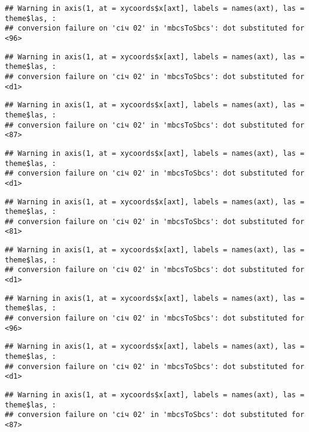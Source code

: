 \documentclass[]{article}
\begin{document}
\begin{verbatim}
## Warning in axis(1, at = xycoords$x[axt], labels = names(axt), las = theme$las, :
## conversion failure on 'січ 02' in 'mbcsToSbcs': dot substituted for <96>
\end{verbatim}

\begin{verbatim}
## Warning in axis(1, at = xycoords$x[axt], labels = names(axt), las = theme$las, :
## conversion failure on 'січ 02' in 'mbcsToSbcs': dot substituted for <d1>
\end{verbatim}

\begin{verbatim}
## Warning in axis(1, at = xycoords$x[axt], labels = names(axt), las = theme$las, :
## conversion failure on 'січ 02' in 'mbcsToSbcs': dot substituted for <87>
\end{verbatim}

\begin{verbatim}
## Warning in axis(1, at = xycoords$x[axt], labels = names(axt), las = theme$las, :
## conversion failure on 'січ 02' in 'mbcsToSbcs': dot substituted for <d1>
\end{verbatim}

\begin{verbatim}
## Warning in axis(1, at = xycoords$x[axt], labels = names(axt), las = theme$las, :
## conversion failure on 'січ 02' in 'mbcsToSbcs': dot substituted for <81>
\end{verbatim}

\begin{verbatim}
## Warning in axis(1, at = xycoords$x[axt], labels = names(axt), las = theme$las, :
## conversion failure on 'січ 02' in 'mbcsToSbcs': dot substituted for <d1>
\end{verbatim}

\begin{verbatim}
## Warning in axis(1, at = xycoords$x[axt], labels = names(axt), las = theme$las, :
## conversion failure on 'січ 02' in 'mbcsToSbcs': dot substituted for <96>
\end{verbatim}

\begin{verbatim}
## Warning in axis(1, at = xycoords$x[axt], labels = names(axt), las = theme$las, :
## conversion failure on 'січ 02' in 'mbcsToSbcs': dot substituted for <d1>
\end{verbatim}

\begin{verbatim}
## Warning in axis(1, at = xycoords$x[axt], labels = names(axt), las = theme$las, :
## conversion failure on 'січ 02' in 'mbcsToSbcs': dot substituted for <87>
\end{verbatim}
\end{document}
